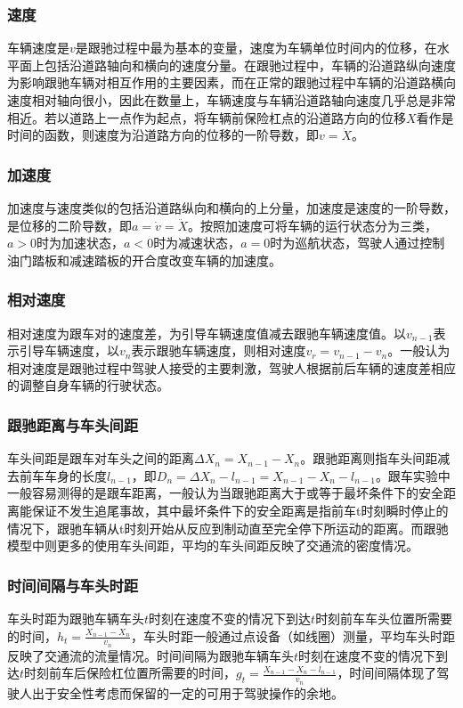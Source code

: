 \subsubsection{速度}
车辆速度是$v$是跟驰过程中最为基本的变量，速度为车辆单位时间内的位移，在水平面上包括沿道路轴向和横向的速度分量。在跟驰过程中，车辆的沿道路纵向速度为影响跟驰车辆对相互作用的主要因素，而在正常的跟驰过程中车辆的沿道路横向速度相对轴向很小，因此在数量上，车辆速度与车辆沿道路轴向速度几乎总是非常相近。若以道路上一点作为起点，将车辆前保险杠点的沿道路方向的位移$X$看作是时间的函数，则速度为沿道路方向的位移的一阶导数，即$v=\dot{X}$。

\subsubsection{加速度}
加速度与速度类似的包括沿道路纵向和横向的上分量，加速度是速度的一阶导数，是位移的二阶导数，即$a=\dot{v}=\ddot{X}$。按照加速度可将车辆的运行状态分为三类，$a>0$时为加速状态，$a<0$时为减速状态，$a=0$时为巡航状态，驾驶人通过控制油门踏板和减速踏板的开合度改变车辆的加速度。

\subsubsection{相对速度}
相对速度为跟车对的速度差，为引导车辆速度值减去跟驰车辆速度值。以$v_{n-1}$表示引导车辆速度，以$v_n$表示跟驰车辆速度，则相对速度$v_r=v_{n-1}-v_n$。一般认为相对速度是跟驰过程中驾驶人接受的主要刺激，驾驶人根据前后车辆的速度差相应的调整自身车辆的行驶状态。

\subsubsection{跟驰距离与车头间距}
车头间距是跟车对车头之间的距离$\Delta X_n=X_{n-1}-X_n$。跟驰距离则指车头间距减去前车车身的长度$l_{n-1}$，即$D_n=\Delta X_n-l_{n-1}=X_{n-1}-X_n-l_{n-1}$。跟车实验中一般容易测得的是跟车距离，一般认为当跟驰距离大于或等于最坏条件下的安全距离能保证不发生追尾事故，其中最坏条件下的安全距离是指前车t时刻瞬时停止的情况下，跟驰车辆从t时刻开始从反应到制动直至完全停下所运动的距离。而跟驰模型中则更多的使用车头间距，平均的车头间距反映了交通流的密度情况。

\subsubsection{时间间隔与车头时距}
车头时距为跟驰车辆车头$t$时刻在速度不变的情况下到达$t$时刻前车车头位置所需要的时间，$h_t=\frac{X_{n-1}-X_n}{v_n}$，车头时距一般通过点设备（如线圈）测量，平均车头时距反映了交通流的流量情况。时间间隔为跟驰车辆车头$t$时刻在速度不变的情况下到达$t$时刻前车后保险杠位置所需要的时间，$g_t=\frac{X_{n-1}-X_n-l_{n-1}}{v_n}$，时间间隔体现了驾驶人出于安全性考虑而保留的一定的可用于驾驶操作的余地。

